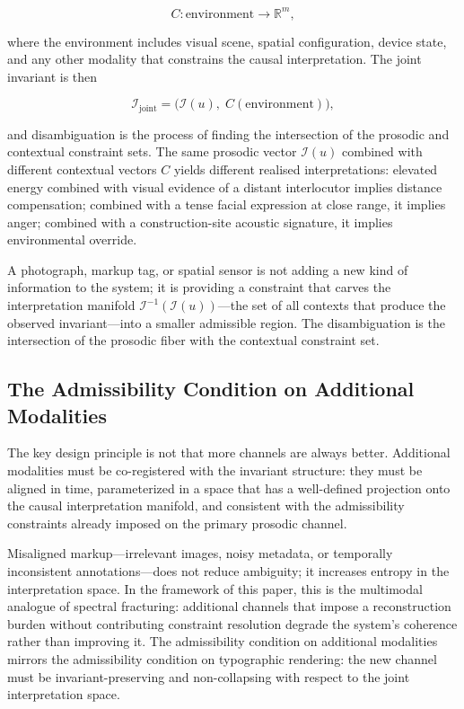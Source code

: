 \documentclass[12pt, a4paper]{article}
\begin{document}
\begin{equation}
C : \text{environment} \to \mathbb{R}^m,
\label{eq:context}
\end{equation}

where the environment includes visual scene, spatial configuration, device state, and any other modality that constrains the causal interpretation. The joint invariant is then

\begin{equation}
\mathcal{I}_{\mathrm{joint}} = \bigl(\mathcal{I}(u),\; C(\text{environment})\bigr),
\label{eq:joint}
\end{equation}

and disambiguation is the process of finding the intersection of the prosodic and contextual constraint sets. The same prosodic vector $\mathcal{I}(u)$ combined with different contextual vectors $C$ yields different realised interpretations: elevated energy combined with visual evidence of a distant interlocutor implies distance compensation; combined with a tense facial expression at close range, it implies anger; combined with a construction-site acoustic signature, it implies environmental override.

A photograph, markup tag, or spatial sensor is not adding a new kind of information to the system; it is providing a constraint that carves the interpretation manifold $\mathcal{I}^{-1}(\mathcal{I}(u))$---the set of all contexts that produce the observed invariant---into a smaller admissible region. The disambiguation is the intersection of the prosodic fiber with the contextual constraint set.

\subsection{The Admissibility Condition on Additional Modalities}

The key design principle is not that more channels are always better. Additional modalities must be co-registered with the invariant structure: they must be aligned in time, parameterized in a space that has a well-defined projection onto the causal interpretation manifold, and consistent with the admissibility constraints already imposed on the primary prosodic channel.

Misaligned markup---irrelevant images, noisy metadata, or temporally inconsistent annotations---does not reduce ambiguity; it increases entropy in the interpretation space. In the framework of this paper, this is the multimodal analogue of spectral fracturing: additional channels that impose a reconstruction burden without contributing constraint resolution degrade the system's coherence rather than improving it. The admissibility condition on additional modalities mirrors the admissibility condition on typographic rendering: the new channel must be invariant-preserving and non-collapsing with respect to the joint interpretation space.
\end{document}
